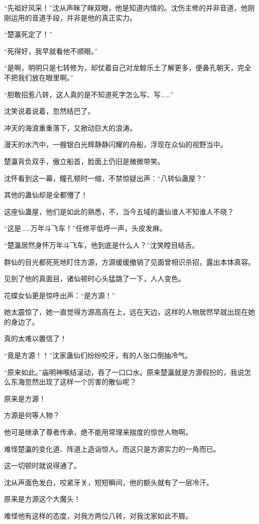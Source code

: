 \begin{this_body}
“先祖好风采！”沈从声眯了眯双眼，他是知道内情的。沈伤主修的并非音道，他刚刚运用的音道手段，并非是他的真正实力。

“楚瀛死定了！”

“死得好，我早就看他不顺眼。”

“是啊，明明只是七转修为，却仗着自己对龙鲸乐土了解更多，便鼻孔朝天，完全不把我们放在眼里啊。”

“胆敢招惹八转，这人真的是不知道死字怎么写、写……”

沈笑说着说着，忽然结巴了。

冲天的海浪重重落下，又掀动巨大的浪涛。

漫天的水汽中，一艘银白光辉静静闪耀的舟船，浮现在众仙的视野当中。

楚瀛背负双手，傲立船首，脸面上仍旧是微微带笑。

沈怀看到这一幕，瞳孔顿时一缩，不禁惊疑出声：“八转仙蛊屋？”

其他的蛊仙却是全都懵了！

这座仙蛊屋，他们是如此的熟悉，不，当今五域的蛊仙谁人不知谁人不晓？

“这是……万年斗飞车！”任修平低呼一声，头皮发麻。

“楚瀛居然身怀万年斗飞车，他到底是什么人？”沈笑瞠目结舌。

群仙的目光都死死地盯住方源，方源缓缓撤销了见面曾相识杀招，露出本体真容。

见到了他的真面目，诸仙顿时心头猛跳了一下，人人变色。

花蝶女仙更是惊呼出声：“是方源！”

她太震惊了，她一直觉得方源高高在上，远在天边，这样的人物居然早就出现在她的身边了。

真的太难以置信了！

“竟是方源！！”沈家蛊仙们纷纷咬牙，有的人张口倒抽冷气。

“原来如此。”庙明神喉结滚动，吞了一口口水。原来楚瀛就是方源假扮的，我说怎么东海忽然出现了这样一个厉害的散仙呢？

原来是方源！

方源是何等人物？

他可是继承了尊者传承，绝不能用常理来揣度的惊世人物啊。

难怪楚瀛的变化道、阵道上造诣惊人。而这只是方源实力的一角而已。

这一切顿时就说得通了。

沈从声面色发白，咬紧牙关，短短瞬间，他的额头就有了一层冷汗。

原来是方源这个大魔头！

难怪他有这样的态度，对我方两位八转，对我沈家如此不屑。


\end{this_body}
